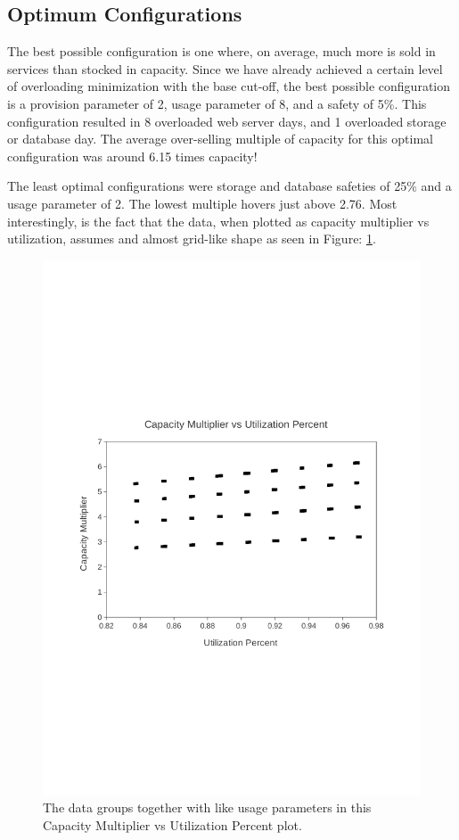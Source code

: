 \documentclass[12pt]{article} %
\begin{document}
\subsection{Optimum Configurations}
The best possible configuration is one where, on average, much more is sold in services than stocked in capacity.  Since we have already achieved a certain level of overloading minimization with the base cut-off, the best possible configuration is a provision parameter of 2, usage parameter of 8, and a safety of 5\%.  
This configuration resulted in 8 overloaded web server days, and 1 overloaded storage or database day.  
The average over-selling multiple of capacity for this optimal configuration was around 6.15 times capacity!


The least optimal configurations were storage and database safeties of 25\% and a usage parameter of 2.  The lowest multiple hovers just above 2.76.  Most interestingly, is the fact that the data, when plotted as capacity multiplier vs utilization, assumes and almost grid-like shape as seen in Figure: \ref{fig:result}.

    \begin{figure}[h]
        \centering
        \includegraphics[trim=6cm 8cm 4cm 10cm]{plots/multiplierVSutil.pdf}
        \caption{The data groups together with like usage parameters in this Capacity Multiplier vs Utilization Percent plot.}
        \label{fig:result}
    \end{figure}
\end{document}
